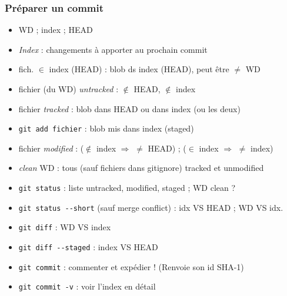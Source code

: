 \documentclass[english, french]{beamer}
\begin{document}
\begin{frame}
	\frametitle{Préparer un commit}
	\begin{itemize}
		\setlength{\itemindent}{-1em}
		\item WD ; index ; HEAD
		\item \emph{Index} : changements à apporter au prochain commit
		\item fich. $\in$ index (HEAD) : blob ds index (HEAD), peut être $≠$ WD
		\item fichier (du WD) \emph{untracked} : $\notin$ HEAD, $\notin$ index
		\item fichier \emph{tracked} : blob dans HEAD ou dans index {\tiny (ou les deux)}
		\item \texttt{git add fichier} : blob mis dans index (\og{}staged\fg{})
		\item fichier \emph{modified} : ($\notin$ index $⇒$ $≠$ HEAD) ; ($\in$ index $⇒$ $≠$ index)
		\item \emph{clean} WD : tous {\tiny (sauf fichiers dans gitignore)} tracked et unmodified
		\item \texttt{git status} : liste untracked, modified, staged ; WD clean ?
		\item \texttt{git status -{}-short} {\tiny (sauf merge conflict)} : idx VS HEAD ; WD VS idx.
		\item \texttt{git diff} : WD VS index
		\item \texttt{git diff -{}-staged} : index VS HEAD
		\item \texttt{git commit} : commenter et expédier ! (Renvoie son id SHA-1)
		\item \texttt{git commit -v} : voir l’index en détail
	\end{itemize}
\end{frame}
\end{document}
